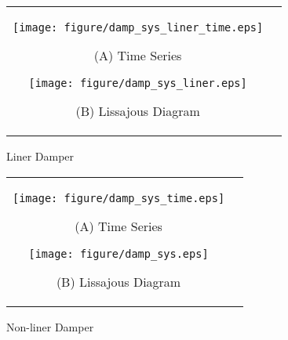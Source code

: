 \documentclass[a4paper,12pt]{article_vdlab_sotsuron}
\begin{document}
\vspace{15mm}
\begin{figure}[h]
    \begin{tabular}{cc}
      \begin{minipage}{0.45\hsize}
	\centering
	  \texttt{[image: figure/damp\_sys\_liner\_time.eps]}
	  \begin{center}
	  \vspace{2mm}
	  \ (A) Time Series\
	  \end{center}
	\end{minipage}
       \begin{minipage}{0.5\hsize}
	\centering
	  \texttt{[image: figure/damp\_sys\_liner.eps]}
	  \begin{center}
	  \vspace{2mm}
	  \ (B) Lissajous Diagram\
	  \end{center}
      \end{minipage}
    \end{tabular}
    \vspace{2mm}
    \caption{Liner Damper}
    \label{fig:liner}
\end{figure}
\vspace{15mm}
\begin{figure}[h]
    \begin{tabular}{cc}
      \begin{minipage}{0.45\hsize}
	\centering
	  \texttt{[image: figure/damp\_sys\_time.eps]}
	  \begin{center}
	  \vspace{2mm}
	  \ (A) Time Series\
	  \end{center}
	\end{minipage}
       \begin{minipage}{0.5\hsize}
	\centering
	  \texttt{[image: figure/damp\_sys.eps]}
	  \begin{center}
	  \vspace{2mm}
	  \ (B) Lissajous Diagram\
	  \end{center}
      \end{minipage}
    \end{tabular}
    \vspace{2mm}
    \caption{Non-liner Damper}
    \label{fig:non}
\end{figure}
\end{document}
